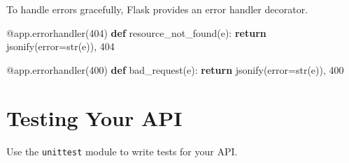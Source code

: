 \documentclass[
  letterpaper,
  DIV=11,
  numbers=noendperiod]{scrreprt}
\newenvironment{Shaded}{\begin{snugshade}}{\end{snugshade}}
\newcommand{\AttributeTok}[1]{\textcolor[rgb]{0.40,0.45,0.13}{#1}}
\newcommand{\BuiltInTok}[1]{\textcolor[rgb]{0.00,0.23,0.31}{#1}}
\newcommand{\ControlFlowTok}[1]{\textcolor[rgb]{0.00,0.23,0.31}{\textbf{#1}}}
\newcommand{\DecValTok}[1]{\textcolor[rgb]{0.68,0.00,0.00}{#1}}
\newcommand{\KeywordTok}[1]{\textcolor[rgb]{0.00,0.23,0.31}{\textbf{#1}}}
\newcommand{\NormalTok}[1]{\textcolor[rgb]{0.00,0.23,0.31}{#1}}
\newcommand{\OperatorTok}[1]{\textcolor[rgb]{0.37,0.37,0.37}{#1}}
\begin{document}
To handle errors gracefully, Flask provides an error handler decorator.

\begin{Shaded}
\begin{Highlighting}[]
\AttributeTok{@app.errorhandler}\NormalTok{(}\DecValTok{404}\NormalTok{)}
\KeywordTok{def}\NormalTok{ resource\_not\_found(e):}
    \ControlFlowTok{return}\NormalTok{ jsonify(error}\OperatorTok{=}\BuiltInTok{str}\NormalTok{(e)), }\DecValTok{404}

\AttributeTok{@app.errorhandler}\NormalTok{(}\DecValTok{400}\NormalTok{)}
\KeywordTok{def}\NormalTok{ bad\_request(e):}
    \ControlFlowTok{return}\NormalTok{ jsonify(error}\OperatorTok{=}\BuiltInTok{str}\NormalTok{(e)), }\DecValTok{400}
\end{Highlighting}
\end{Shaded}

\section{Testing Your API}\label{testing-your-api}

Use the \texttt{unittest} module to write tests for your API.
\end{document}
